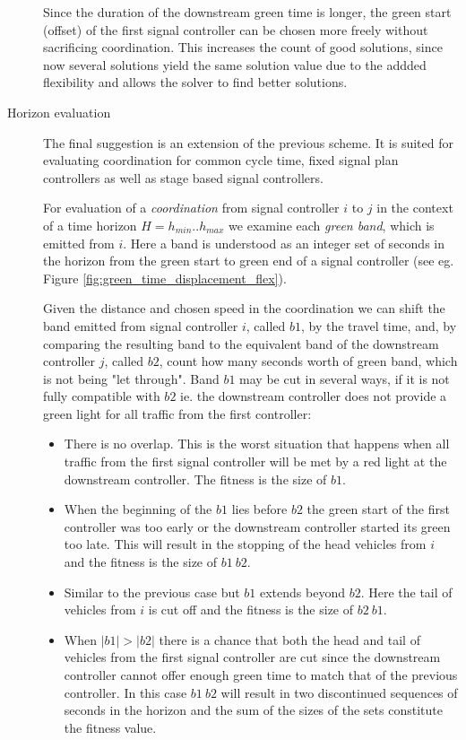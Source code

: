 \begin{description}
Since the duration of the downstream green time is longer, the green start (offset) of the first signal controller can be chosen more freely without sacrificing coordination. This increases the count of good solutions, since now several solutions yield the same solution value due to the addded flexibility and allows the solver to find better solutions.

\item[Horizon evaluation]
The final suggestion is an extension of the previous scheme. It is suited for evaluating coordination for common cycle time, fixed signal plan controllers as well as stage based signal controllers.

For evaluation of a \textit{coordination} from signal controller $i$ to $j$ in the context of a time horizon $H = h_{min} .. h_{max}$ we examine each \textit{green band}, which is emitted from $i$. Here a band is understood as an integer set of seconds in the horizon from the green start to green end of a signal controller (see eg. Figure \ref{fig:green_time_displacement_flex}).

Given the distance and chosen speed in the coordination we can shift the band emitted from signal controller $i$, called $b1$, by the travel time, and, by comparing the resulting band to the equivalent band of the downstream controller $j$, called $b2$, count how many seconds worth of green band, which is not being "let through". Band $b1$ may be cut in several ways, if it is not fully compatible with $b2$ ie. the downstream controller does not provide a green light for all traffic from the first controller:

\begin{itemize}
\item There is no overlap. This is the worst situation that happens when all traffic from the first signal controller will be met by a red light at the downstream controller. The fitness is the size of $b1$.
\item When the beginning of the $b1$ lies before $b2$ the green start of the first controller was too early or the downstream controller started its green too late. This will result in the stopping of the head vehicles from $i$ and the fitness is the size of $b1 \ b2$.
\item Similar to the previous case but $b1$ extends beyond $b2$. Here the tail of vehicles from $i$ is cut off and the fitness is the size of $b2 \ b1$.
\item When $|b1|>|b2|$ there is a chance that both the head and tail of vehicles from the first signal controller are cut since the downstream controller cannot offer enough green time to match that of the previous controller. In this case $b1 \ b2$ will result in two discontinued sequences of seconds in the horizon and the sum of the sizes of the sets constitute the fitness value.
\end{itemize}


\end{description}
